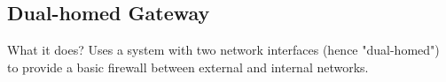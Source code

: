 \subsection{Dual-homed Gateway}
\begin{quotebox-yellow}{What it does?}
Uses a system with two network interfaces (hence "dual-homed") to provide a basic firewall between external and internal networks.
\end{quotebox-yellow}













